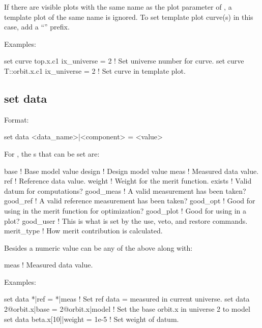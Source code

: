 {{If there are visible plots with the same name as the plot parameter of , a template plot
of the same name is ignored. To set template plot curve(s) in this case, add a ``'' prefix.

Examples:
\begin{example}
  set curve top.x.c1 ix_universe = 2       ! Set universe number for curve.
  set curve T::orbit.x.c1 ix_universe = 2  ! Set curve in template plot.
\end{example}


\subsection{set data}
\label{s:set.data}

Format:
\begin{example}
  set data <data_name>|<component> = <value>
\end{example}

For , the s that can be set are:
\begin{example}
  base        ! Base model value
  design      ! Design model value
  meas        ! Measured data value.
  ref         ! Reference data value.
  weight      ! Weight for the merit function.
  exists      ! Valid datum for computations?
  good_meas   ! A valid measurement has been taken?
  good_ref    ! A valid reference measurement has been taken?
  good_opt    ! Good for using in the merit function for optimization?
  good_plot   ! Good for using in a plot?
  good_user   ! This is what is set by the use, veto, and restore commands.
  merit_type  ! How merit contribution is calculated.
\end{example}
Besides a numeric value  can be any of the above along with:
\begin{example}
  meas        ! Measured data value.
\end{example}

Examples:
\begin{example}
  set data *|ref = *|meas            ! Set ref data = measured in current universe.
  set data 2@orbit.x|base = 2@orbit.x|model 
                                     ! Set the base orbit.x in universe 2 to model
  set data beta.x[10]|weight = 1e-5  ! Set weight of datum.
\end{example}


}}
